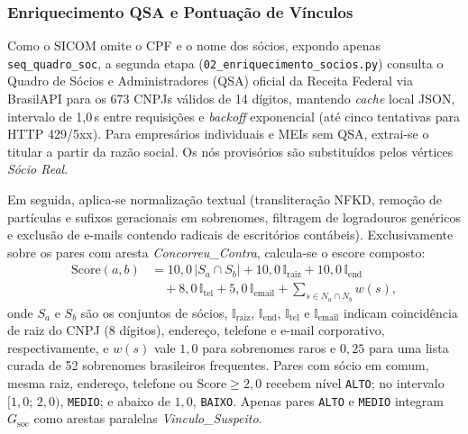 \subsubsection{Enriquecimento QSA e Pontuação de Vínculos}
Como o SICOM omite o CPF e o nome dos sócios, expondo apenas \texttt{seq\_\allowbreak quadro\_\allowbreak soc}, a segunda etapa (\texttt{02\_\allowbreak enriquecimento\_\allowbreak socios\allowbreak .py}) consulta o Quadro de Sócios e Administradores (QSA) oficial da Receita Federal via BrasilAPI para os 673 CNPJs válidos de 14 dígitos, mantendo \textit{cache} local JSON, intervalo de 1{,}0\,s entre requisições e \textit{backoff} exponencial (até cinco tentativas para HTTP 429/5xx). Para empresários individuais e MEIs sem QSA, extrai-se o titular a partir da razão social. Os nós provisórios são substituídos pelos vértices \textit{Sócio Real}.

Em seguida, aplica-se normalização textual (transliteração NFKD, remoção de partículas e sufixos geracionais em sobrenomes, filtragem de logradouros genéricos e exclusão de e-mails contendo radicais de escritórios contábeis). Exclusivamente sobre os pares com aresta \textit{Concorreu\_\allowbreak Contra}, calcula-se o escore composto:
\begin{equation}
\begin{aligned}
  \text{Score}(a,b) &= 10{,}0\,|S_a \cap S_b| + 10{,}0\,\mathbb{I}_{\text{raiz}} + 10{,}0\,\mathbb{I}_{\text{end}} \\
                    &\quad + 8{,}0\,\mathbb{I}_{\text{tel}} + 5{,}0\,\mathbb{I}_{\text{email}} + \sum_{s \in N_a \cap N_b} w(s),
\end{aligned}
\label{eq:score_societario}
\end{equation}
onde $S_a$ e $S_b$ são os conjuntos de sócios, $\mathbb{I}_{\text{raiz}}$, $\mathbb{I}_{\text{end}}$, $\mathbb{I}_{\text{tel}}$ e $\mathbb{I}_{\text{email}}$ indicam coincidência de raiz do CNPJ (8 dígitos), endereço, telefone e e-mail corporativo, respectivamente, e $w(s)$ vale $1{,}0$ para sobrenomes raros e $0{,}25$ para uma lista curada de 52 sobrenomes brasileiros frequentes. Pares com sócio em comum, mesma raiz, endereço, telefone ou $\text{Score} \ge 2{,}0$ recebem nível \texttt{ALTO}; no intervalo $[1{,}0;\, 2{,}0)$, \texttt{MEDIO}; e abaixo de $1{,}0$, \texttt{BAIXO}. Apenas pares \texttt{ALTO} e \texttt{MEDIO} integram $G_{\text{soc}}$ como arestas paralelas \textit{Vinculo\_\allowbreak Suspeito}.


